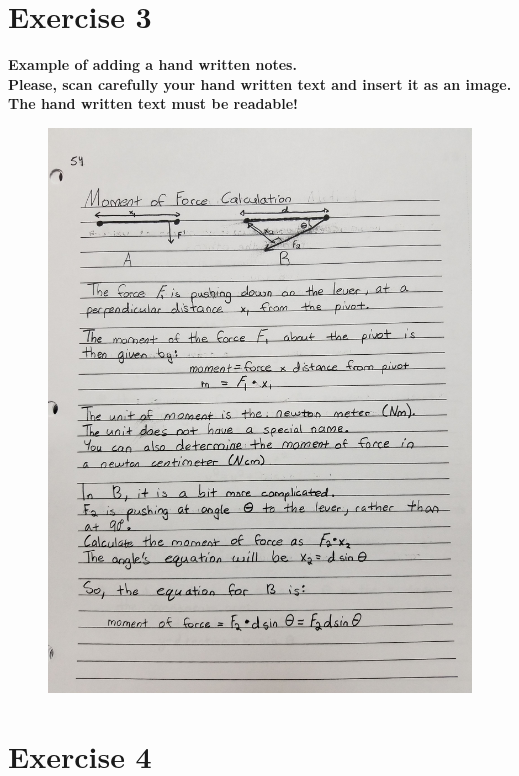 \documentclass[a4paper]{article}
\begin{document}
\newpage
\section*{Exercise 3}

\noindent \textbf{Example of adding a hand written notes.} \\
\textbf{ \color{red} Please, scan carefully your hand written text and insert it as an image.} \\
\textbf{ \color{red} The hand written text must be readable!} \\

\begin{figure}[h!]
    \centering
    \includegraphics[width=0.96\linewidth]{images/hand_text.jpg}
\end{figure}

\section*{Exercise 4}
\end{document}
